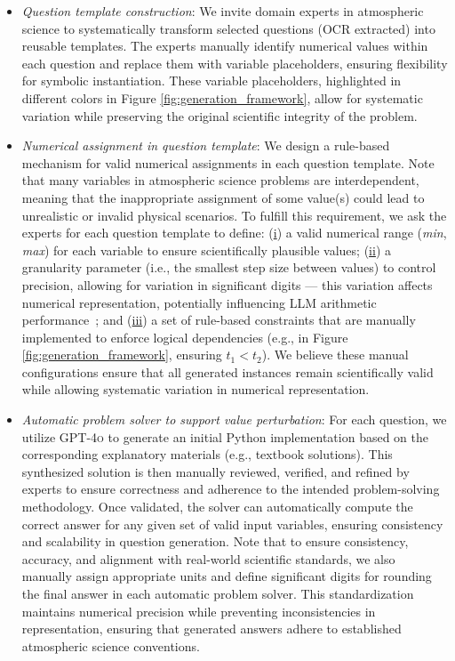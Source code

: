 \begin{itemize}[topsep=5pt, leftmargin=1em]
\vspace{-0.5em}
\item \textit{Question template construction}: We invite domain experts in atmospheric science to systematically transform selected questions (OCR extracted) into reusable templates. The experts manually identify numerical values within each question and replace them with variable placeholders, ensuring flexibility for symbolic instantiation. These variable placeholders, highlighted in different colors in Figure \ref{fig:generation_framework}, allow for systematic variation while preserving the original scientific integrity of the problem.


\vspace{-0.35em}
\item \textit{Numerical assignment in question template}: We design a rule-based mechanism for valid numerical assignments in each question template. Note that many variables in atmospheric science problems are interdependent, meaning that the inappropriate assignment of some value(s) could lead to unrealistic or invalid physical scenarios. To fulfill this requirement, we ask the experts for each question template to define: (\underline{i}) a valid numerical range (\textit{min}, \textit{max}) for each variable to ensure scientifically plausible values; (\underline{ii}) a granularity parameter (i.e., the smallest step size between values) to control precision, allowing for variation in significant digits --- this variation affects numerical representation, potentially influencing LLM arithmetic performance~\cite{schwartz2024numerologic, yang2024number, singh2024tokenization}; and (\underline{iii}) a set of rule-based constraints that are manually implemented to enforce logical dependencies (e.g., in Figure \ref{fig:generation_framework}, ensuring $t_1 < t_2$). We believe these manual configurations ensure that all generated instances remain scientifically valid while allowing systematic variation in numerical representation.



\vspace{-0.35em}
\item \textit{Automatic problem solver to support value perturbation}: For each question, we utilize \textsc{GPT-4o} to generate an initial Python implementation based on the corresponding explanatory materials (e.g., textbook solutions). This synthesized solution is then manually reviewed, verified, and refined by experts to ensure correctness and adherence to the intended problem-solving methodology. Once validated, the solver can automatically compute the correct answer for any given set of valid input variables, ensuring consistency and scalability in question generation. Note that to ensure consistency, accuracy, and alignment with real-world scientific standards, we also manually assign appropriate units and define significant digits for rounding the final answer in each automatic problem solver. This standardization maintains numerical precision while preventing inconsistencies in representation, ensuring that generated answers adhere to established atmospheric science conventions.



\end{itemize}
